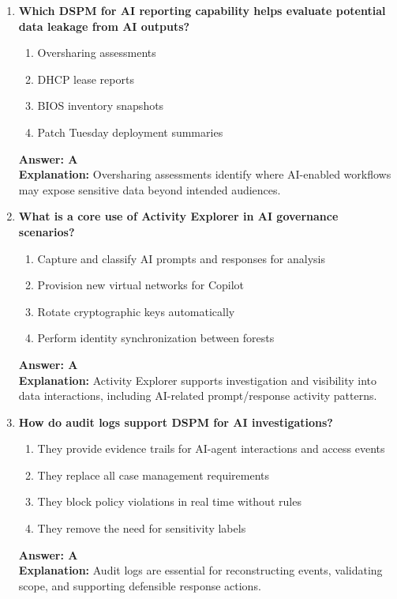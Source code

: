 \documentclass[10pt]{article}
\begin{document}
\begin{enumerate}[leftmargin=*]
\item \textbf{Which DSPM for AI reporting capability helps evaluate potential data leakage from AI outputs?}
\begin{enumerate}[label=\Alph*.]
  \item Oversharing assessments
  \item DHCP lease reports
  \item BIOS inventory snapshots
  \item Patch Tuesday deployment summaries
\end{enumerate}
\textbf{Answer: A}\\
\textbf{Explanation:} Oversharing assessments identify where AI-enabled workflows may expose sensitive data beyond intended audiences.

\item \textbf{What is a core use of Activity Explorer in AI governance scenarios?}
\begin{enumerate}[label=\Alph*.]
  \item Capture and classify AI prompts and responses for analysis
  \item Provision new virtual networks for Copilot
  \item Rotate cryptographic keys automatically
  \item Perform identity synchronization between forests
\end{enumerate}
\textbf{Answer: A}\\
\textbf{Explanation:} Activity Explorer supports investigation and visibility into data interactions, including AI-related prompt/response activity patterns.

\item \textbf{How do audit logs support DSPM for AI investigations?}
\begin{enumerate}[label=\Alph*.]
  \item They provide evidence trails for AI-agent interactions and access events
  \item They replace all case management requirements
  \item They block policy violations in real time without rules
  \item They remove the need for sensitivity labels
\end{enumerate}
\textbf{Answer: A}\\
\textbf{Explanation:} Audit logs are essential for reconstructing events, validating scope, and supporting defensible response actions.


\end{enumerate}
\end{document}
